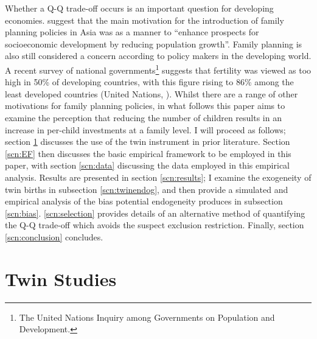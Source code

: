 \documentclass{article}[11pt,subeqn]
\begin{document}
\begin{spacing}{1.25}
Whether a Q-Q trade-off occurs is an important question for developing economies.  \citet{Clelandetal2006} suggest that the main motivation for the introduction of family planning policies in Asia was as a manner to ``enhance prospects for socioeconomic development by reducing population growth''.  Family planning is also still considered a concern according to policy makers in the developing world.  A recent survey of national governments\footnote{The United Nations Inquiry among Governments on Population and Development.} suggests that fertility was viewed as too high in 50\% of developing countries, with this figure rising to 86\% among the least developed countries (United Nations, \citeyear{UN2010}).   Whilst there are a range of other motivations for family planning policies, in what follows this paper aims to examine the perception that reducing the number of children results in an increase in per-child investments at a family level.  I will proceed as follows; section \ref{scn:lit} discusses the use of the twin instrument in prior literature.  Section \ref{scn:EF} then discusses the basic empirical framework to be employed in this paper, with section \ref{scn:data} discussing the data employed in this empirical analysis.  Results are presented in section \ref{scn:results}; I examine the exogeneity of twin births in subsection \ref{scn:twinendog}, and then provide a simulated and empirical analysis of the bias potential endogeneity produces in subsection \ref{scn:bias}.  \ref{scn:selection} provides details of an alternative method of quantifying the Q-Q trade-off which avoids the suspect exclusion restriction.  Finally, section \ref{scn:conclusion} concludes. 

\section{Twin Studies}
\label{scn:lit}





\end{spacing}
\end{document}
